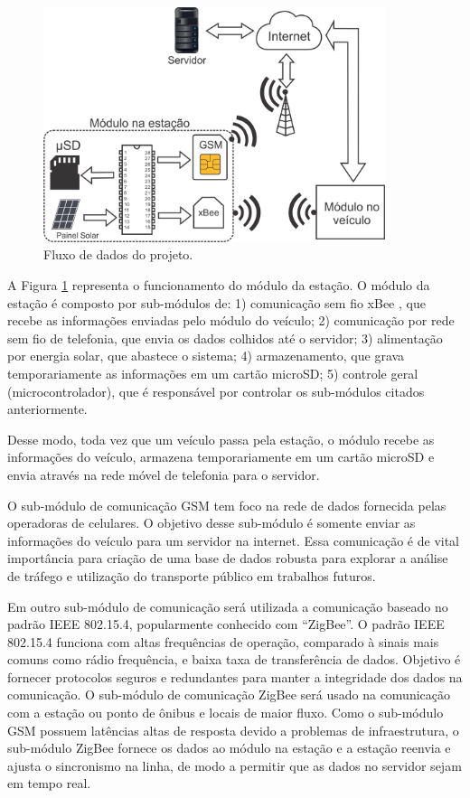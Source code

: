 \documentclass[12pt]{uftpibicsic2018}
\begin{document}
\begin{figure}[!h]
\centering
\includegraphics[width=10cm]{ruti2.png}
\caption{Fluxo de dados do projeto.}
\label{fig:modulo_estacao}
\end{figure}

A Figura \ref{fig:modulo_estacao} representa o funcionamento do módulo da estação. O módulo da estação é composto por sub-módulos de: 1) comunicação sem fio xBee \cite{xbee}, que recebe as informações enviadas pelo módulo do veículo; 2) comunicação por rede sem fio de telefonia, que envia os dados colhidos até o servidor; 3) alimentação por energia solar, que abastece o sistema; 4) armazenamento, que grava temporariamente as informações em um cartão microSD; 5) controle geral (microcontrolador), que é responsável por controlar os sub-módulos citados anteriormente.

Desse modo, toda vez que um veículo passa pela estação, o módulo recebe as informações do veículo, armazena temporariamente em um cartão microSD e envia através na rede móvel de telefonia para o servidor.

O sub-módulo de comunicação GSM tem foco na rede de dados fornecida pelas operadoras de celulares. O objetivo desse sub-módulo é somente enviar as informações do veículo para um servidor na internet. Essa comunicação é de vital importância para criação de uma base de dados robusta para explorar a análise de tráfego e utilização do transporte público em trabalhos futuros.

Em outro sub-módulo de comunicação será utilizada a comunicação baseado no padrão IEEE 802.15.4, popularmente conhecido com ``ZigBee''. O padrão IEEE 802.15.4 funciona com altas frequências de operação, comparado à sinais mais comuns como rádio frequência, e baixa taxa de transferência de dados. Objetivo é fornecer protocolos seguros e redundantes para manter a integridade dos dados na comunicação. O sub-módulo de comunicação ZigBee será usado na comunicação com a estação ou ponto de ônibus e locais de maior fluxo. Como o sub-módulo GSM possuem latências altas de resposta devido a problemas de infraestrutura, o sub-módulo ZigBee fornece os dados ao módulo na estação e a estação reenvia e ajusta o sincronismo na linha, de modo a permitir que as dados no servidor sejam em tempo real.
\end{document}
